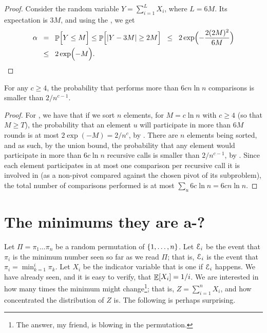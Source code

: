 \begin{proof}
    Consider the random variable $Y = \sum_{i=1}^L X_i$, where $L =
    6M$. Its expectation is $3M$, and using the
    , we
    get
    \begin{align*}
        \alpha%
        &\EQ%
        \Prob{\Bigl. Y \leq M}%
        \leq%
        \Prob{\Bigl.\cardin{Y - 3M} \geq 2M \bigr.}%
        \LEQ%
        2\exp \Bigl(-\frac{2(2M)^2}{ 6M } \Bigr)
        \\&
        \LEQ%
        2\exp\Bigl( -M   \Bigr).
    \end{align*}
\end{proof}


\begin{lemma}
    For any $c \geq 4$, the probability that \QuickSort{} performs more than
    $6c n \ln n$ comparisons is smaller than $2/n^{c-1}$.
\end{lemma}

\begin{proof}
    For \QuickSort{}, we have that if we sort $n$ elements, for
    $M=c \ln n$ with $c \geq 4$ (so that $M \geq T$), the probability that an
    element $u$ will participate in more than $6M$ rounds is at most
    $2\exp( -M) = 2/n^c$, by .  There are $n$
    elements being sorted, and as such, by the union bound, the
    probability that any element would participate in more than
    $6 c \ln n$ recursive calls is smaller than $2/n^{c-1}$, by
    .  Since each element participates in at most
    one comparison per recursive call it is involved in (as a non-pivot
    compared against the chosen pivot of its subproblem), the total
    number of comparisons performed is at most
    $\sum_{u} 6c \ln n = 6c n \ln n$.
\end{proof}

\section{The minimums they are a-?}

Let $\Pi = \pi_1 \dots \pi_n$ be a random permutation of $\left\{ {1,
   \dots, n} \right\}$. Let $\EuScript{E}_i$ be the event that $\pi_i$ is the
minimum number seen so far as we read $\Pi$; that is, $\EuScript{E}_i$ is
the event that $\pi_i = \min_{k=1}^i \pi_k$. Let $X_i$ be the
indicator variable that is one if $\EuScript{E}_i$ happens. We have already seen,
and it is easy to verify, that $\mathop{\mathbb{E}}\!\left[ {X_i} \right] = 1/i$. We are interested in
how many times the minimum might change\footnote{The answer, my
   friend, is blowing in the permutation.}; that is, $Z=\sum_{i=1}^n X_i$,
and how concentrated the distribution of $Z$ is. The following is
perhaps surprising.

